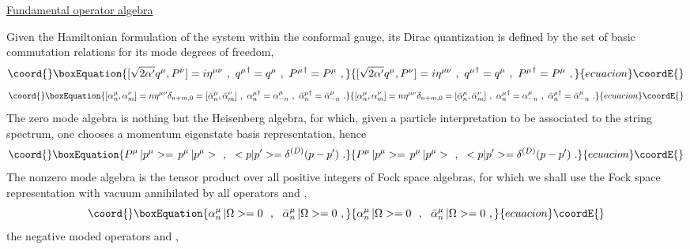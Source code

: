 \documentclass[a4paper,11pt]{article}
\begin{document}
\vspace{5pt}

\noindent\underline{Fundamental operator algebra}

\vspace{10pt}

Given the Hamiltonian formulation of the system within the conformal
gauge, its Dirac quantization is defined by the set of basic commutation
relations for its mode degrees of freedom,
\begin{equation}\coord{}\boxEquation{
[\sqrt{2\alpha'}q^\mu,P^\nu]=i\eta^{\mu\nu}\ ,\ {q^\mu}^\dagger=q^\mu\ ,\
{P^\mu}^\dagger=P^\mu\ ,
}{
[\sqrt{2\alpha'}q^\mu,P^\nu]=i\eta^{\mu\nu}\ ,\ {q^\mu}^\dagger=q^\mu\ ,\
{P^\mu}^\dagger=P^\mu\ ,
}{ecuacion}\coordE{}\end{equation}
\begin{equation}\coord{}\boxEquation{
[\alpha^\mu_n,\alpha^\nu_m]=n\eta^{\mu\nu}\delta_{n+m,0}=
[\bar{\alpha}^\mu_n,\bar{\alpha}^\nu_m]\ ,\ 
{\alpha^\mu_n}^\dagger=\alpha^\mu_{-n}\ ,\
{\bar{\alpha}^{\mu\dagger}_n}=\bar{\alpha}^\mu_{-n}\ .
}{
[\alpha^\mu_n,\alpha^\nu_m]=n\eta^{\mu\nu}\delta_{n+m,0}=
[\bar{\alpha}^\mu_n,\bar{\alpha}^\nu_m]\ ,\ 
{\alpha^\mu_n}^\dagger=\alpha^\mu_{-n}\ ,\
{\bar{\alpha}^{\mu\dagger}_n}=\bar{\alpha}^\mu_{-n}\ .
}{ecuacion}\coordE{}\end{equation}
The zero mode algebra is nothing but the Heisenberg algebra, for which,
given a particle interpretation to be associated to the string spectrum,
one chooses a momentum eigenstate basis representation, hence
\begin{equation}\coord{}\boxEquation{
P^\mu\,|p^\mu>=\,p^\mu\,|p^\mu>\ \ ,\ \ 
<p|p'>=\delta^{(D)}(p-p')\ .
}{
P^\mu\,|p^\mu>=\,p^\mu\,|p^\mu>\ \ ,\ \ 
<p|p'>=\delta^{(D)}(p-p')\ .
}{ecuacion}\coordE{}\end{equation}
The nonzero mode algebra is the tensor product over all positive integers
\myHighlight{$n\ge 1$}\coordHE{} of Fock space algebras, for which we shall use the Fock space
representation with vacuum \myHighlight{$|\Omega>$}\coordHE{} annihilated by all operators 
\myHighlight{$\alpha^\mu_n$}\coordHE{} and \coordHE{},
\begin{equation}\coord{}\boxEquation{
\alpha^\mu_n\,|\Omega>=0\ \ ,\ \ 
\bar{\alpha}^\mu_n\,|\Omega>=0\ ,
}{
\alpha^\mu_n\,|\Omega>=0\ \ ,\ \ 
\bar{\alpha}^\mu_n\,|\Omega>=0\ ,
}{ecuacion}\coordE{}\end{equation}
the negative moded operators \myHighlight{$\alpha^\mu_{-n}$}\coordHE{} and \coordHE{},
\end{document}
